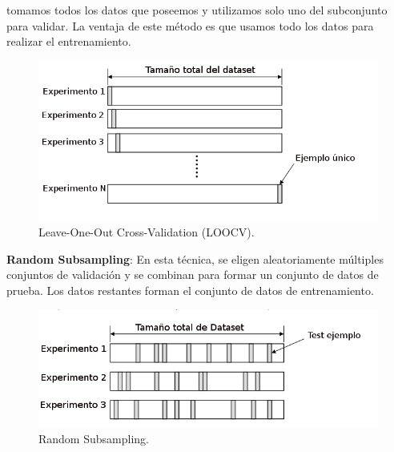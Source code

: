tomamos todos los datos que poseemos y utilizamos solo uno del subconjunto para validar. La ventaja de este método es que usamos todo los datos para realizar el entrenamiento.

\begin{figure}[H]
 \centering
  \includegraphics[scale=0.4,keepaspectratio=true,clip=true]{imagenes/MarcoTeorico/cross-validation-LOOCV.png}
  \caption{Leave-One-Out Cross-Validation (LOOCV).}%
	\label{Fig: crossvalidation-LOOCV}
\end{figure}

\par \textbf{Random Subsampling}: En esta técnica, se eligen aleatoriamente múltiples conjuntos de validación y se combinan para formar un conjunto de datos de prueba. Los datos restantes forman el conjunto de datos de entrenamiento.

\begin{figure}[H]
 \centering
  \includegraphics[scale=0.5,keepaspectratio=true,clip=true]{imagenes/MarcoTeorico/cross-validation-random.png}
  \caption{Random Subsampling.}%
	\label{Fig: random-Subsampling}
\end{figure}


